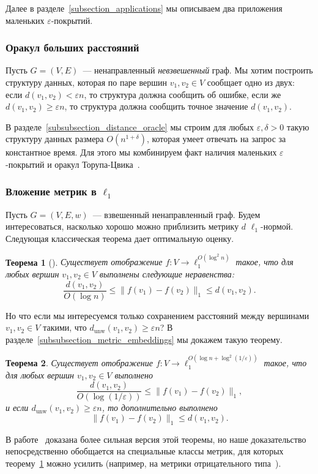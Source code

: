 \documentclass[12pt]{article}
\newcommand{\eps}{\varepsilon}
\newcommand{\dunw}{d_{\mathrm{unw}}}
\newtheorem{theorem}{Теорема}
\begin{document}
    Далее в разделе~\ref{subsection_applications} мы описываем два приложения маленьких $\eps$-покрытий.
    \subsubsection{Оракул больших расстояний}
    Пусть $G = (V, E)$~--- ненаправленный \emph{невзвешенный} граф.
    Мы хотим построить структуру данных, которая по паре вершин $v_1, v_2 \in V$ сообщает одно из двух:
    если $d(v_1, v_2) < \eps n$, то структура должна сообщить об ошибке, если же $d(v_1, v_2) \geq \eps n$,
    то структура должна сообщить точное значение $d(v_1, v_2)$.

    В разделе~\ref{subsubsection_distance_oracle} мы строим для любых $\eps, \delta > 0$
    такую структуру данных размера $O(n^{1 + \delta})$, которая умеет отвечать на запрос за константное время.
    Для этого мы комбинируем факт наличия маленьких $\eps$-покрытий и оракул Торупа-Цвика~\cite{TZ05}.
    \subsubsection{Вложение метрик в $\ell_1$}
    Пусть $G = (V, E, w)$~--- взвешенный ненаправленный граф.
    Будем интересоваться, насколько хорошо можно приблизить метрику $d$ $\ell_1$-нормой.
    Следующая классическая теорема дает оптимальную оценку.
    \begin{theorem}[\cite{B85}]
        \label{theorem_bourgain}
        Существует отображение $f \colon V \to \ell_1^{O(\log^2 n)}$ такое, что для любых вершин 
        $v_1, v_2 \in V$ выполнены следующие неравенства:
        $$
            \frac{d(v_1, v_2)}{O(\log n)} \leq \|f(v_1) - f(v_2)\|_1 \leq d(v_1, v_2).
        $$
    \end{theorem}

    Но что если мы интересуемся только сохранением расстояний между вершинами $v_1, v_2 \in V$ такими, что
    $\dunw(v_1, v_2) \geq \eps n$? В разделе~\ref{subsubsection_metric_embeddings} мы докажем такую теорему.

    \begin{theorem}
        Существует отображение $f \colon V \to \ell_1^{O(\log n + \log^2 (1 / \eps))}$ такое, что для любых вершин 
        $v_1, v_2 \in V$ выполнено
        $$
            \frac{d(v_1, v_2)}{O(\log (1/\eps))} \leq \|f(v_1) - f(v_2)\|_1,
        $$
        и если $\dunw(v_1, v_2) \geq \eps n$, то дополнительно выполнено
        $$
            \|f(v_1) - f(v_2)\|_1 \leq d(v_1, v_2).
        $$
    \end{theorem}
    В работе~\cite{ABCDGKNS05} доказана более сильная версия этой теоремы, но наше доказательство непосредственно
    обобщается на
    специальные классы метрик, для которых теорему~\ref{theorem_bourgain} можно усилить (например, на метрики
    отрицательного типа~\cite{ALN07}).
\end{document}
